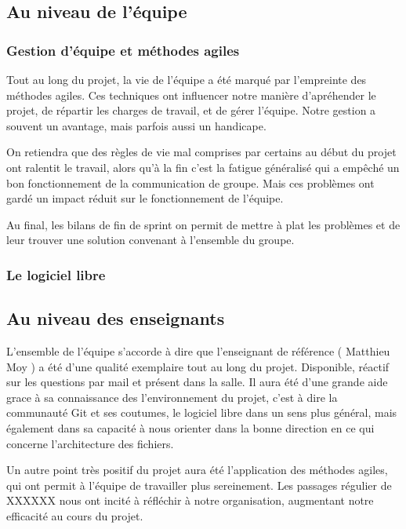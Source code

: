 \documentclass[11pt]{article}
\begin{document}
\begin{itemize}
\subsection*{Au niveau de l'équipe}

\subsubsection*{Gestion d'équipe et méthodes agiles}

Tout au long du projet, la vie de l'équipe a été marqué par l'empreinte des
méthodes agiles. Ces techniques ont influencer notre manière d'apréhender 
le projet, de répartir les charges de travail, et de gérer l'équipe. Notre
gestion a souvent un avantage, mais parfois aussi un handicape. 

On retiendra que des règles de vie mal comprises par certains au début du 
projet ont ralentit le travail, alors qu'à la fin c'est la fatigue généralisé
qui a empêché un bon fonctionnement de la communication de groupe. Mais ces
problèmes ont gardé un impact réduit sur le fonctionnement de l'équipe. 

Au final, les bilans de fin de sprint on permit de mettre à plat les problèmes
et de leur trouver une solution convenant à l'ensemble du groupe. 

\subsubsection*{Le logiciel libre }

\subsection*{Au niveau des enseignants}

L'ensemble de l'équipe s'accorde à dire que l'enseignant de référence ( Matthieu Moy ) a été d'une qualité exemplaire tout au long du projet. Disponible, réactif sur les questions par mail et présent dans la salle. Il aura été d'une grande aide grace à sa connaissance des l'environnement du projet, c'est à dire la communauté Git et ses coutumes, le logiciel libre dans un sens plus général, mais également dans sa capacité à nous orienter dans la bonne direction en ce qui concerne l'architecture des fichiers. 

Un autre point très positif du projet aura été l'application des méthodes agiles, qui ont permit à l'équipe de travailler plus sereinement. Les passages régulier de XXXXXX nous ont incité à réfléchir à notre organisation, augmentant notre efficacité au cours du projet. 


\end{itemize}
\end{document}
